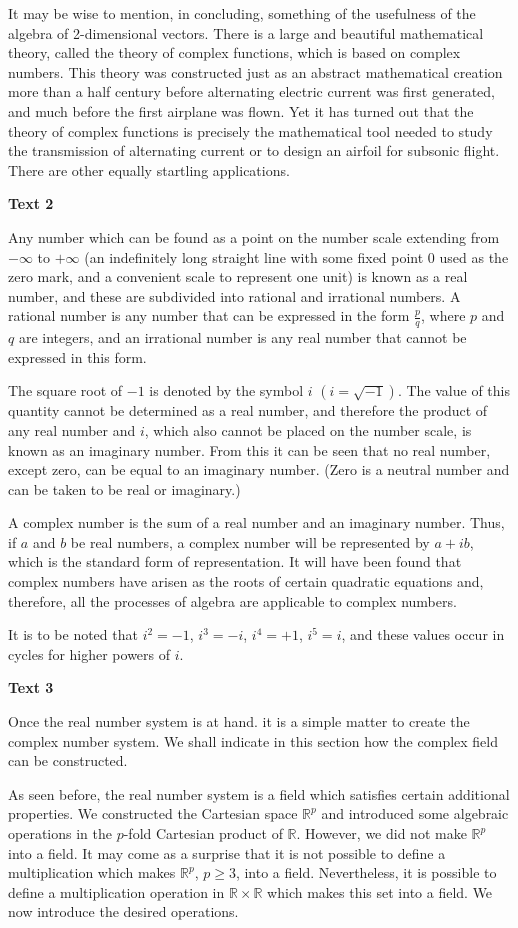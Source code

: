 \documentclass[a4paper]{article}
\newcommand{\ESect}[1]{\medskip\par{\large \textbf{#1}}\par}
\begin{document}
It may be wise to mention, in concluding, something of the usefulness of the algebra of 2-dimensional vectors. There is a
large and beautiful mathematical theory, called the theory of complex functions, which is based on complex numbers. This
theory was constructed just as an abstract mathematical creation more than a half century before alternating electric
current was first generated, and much before the first airplane was flown. Yet it has turned out that the theory of complex
functions is precisely the mathematical tool needed to study the transmission of alternating current or to design an airfoil
for subsonic flight. There are other equally startling applications.

\ESect{Text 2}
Any number which can be found as a point on the number scale extending from $-\infty$ to $+\infty$ (an indefinitely long
straight line with some fixed point 0 used as the zero mark, and a convenient scale to represent one unit) is known as a
real number, and these are subdivided into rational and irrational numbers. A rational number is any number that can be
expressed in the form $\frac{p}{q}$, where $p$ and $q$ are integers, and an irrational number is any real number that cannot
be expressed in this form.

The square root of $-1$ is denoted by the symbol $i$ $(i = \sqrt{-1})$. The value of this quantity cannot be determined as a
real number, and therefore the product of any real number and $i$, which also cannot be placed on the number scale, is known
as an imaginary number. From this it can be seen that no real number, except zero, can be equal to an imaginary number. (Zero
is a neutral number and can be taken to be real or imaginary.)

A complex number is the sum of a real number and an imaginary number. Thus, if $a$ and $b$ be real numbers, a complex number
will be represented by $a+ib$, which is the standard form of representation. It will have been found that complex numbers have
arisen as the roots of certain quadratic equations and, therefore, all the processes of algebra are applicable to complex numbers.

It is to be noted that $i^2=-1$, $i^3=-i$, $i^4=+1$, $i^5=i$, and these values occur in cycles for higher powers of $i$.

\ESect{Text 3}
Once the real number system is at hand. it is a simple matter to create the complex number system. We shall indicate in this
section how the complex field can be constructed.

As seen before, the real number system is a field which satisfies certain additional properties. We constructed the Cartesian
space $\mathbb{R}^p$ and introduced some algebraic operations in the $p$-fold Cartesian product of $\mathbb{R}$. However, we
did not make $\mathbb{R}^p$ into a field. It may come as a surprise that it is not possible to define a multiplication which
makes $\mathbb{R}^p$, $p \geqslant 3$, into a field. Nevertheless, it is possible to define a multiplication operation in
$\mathbb{R} \times \mathbb{R}$ which makes this set into a field. We now introduce the desired operations.
\end{document}
